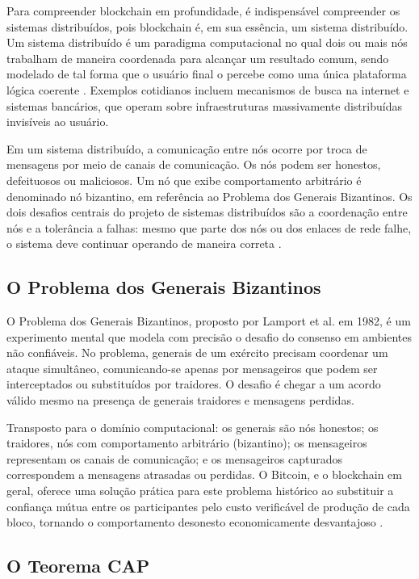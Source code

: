 \documentclass[12pt,a4paper]{report}
\begin{document}
Para compreender blockchain em profundidade, é indispensável compreender os sistemas distribuídos, pois blockchain é, em sua essência, um sistema distribuído. Um sistema distribuído é um paradigma computacional no qual dois ou mais nós trabalham de maneira coordenada para alcançar um resultado comum, sendo modelado de tal forma que o usuário final o percebe como uma única plataforma lógica coerente \cite{Bashir2023}. Exemplos cotidianos incluem mecanismos de busca na internet e sistemas bancários, que operam sobre infraestruturas massivamente distribuídas invisíveis ao usuário.

Em um sistema distribuído, a comunicação entre nós ocorre por troca de mensagens por meio de canais de comunicação. Os nós podem ser honestos, defeituosos ou maliciosos. Um nó que exibe comportamento arbitrário é denominado nó bizantino, em referência ao Problema dos Generais Bizantinos. Os dois desafios centrais do projeto de sistemas distribuídos são a coordenação entre nós e a tolerância a falhas: mesmo que parte dos nós ou dos enlaces de rede falhe, o sistema deve continuar operando de maneira correta \cite{Bashir2023}.

\subsection{O Problema dos Generais Bizantinos}

O Problema dos Generais Bizantinos, proposto por Lamport et al. em 1982, é um experimento mental que modela com precisão o desafio do consenso em ambientes não confiáveis. No problema, generais de um exército precisam coordenar um ataque simultâneo, comunicando-se apenas por mensageiros que podem ser interceptados ou substituídos por traidores. O desafio é chegar a um acordo válido mesmo na presença de generais traidores e mensagens perdidas.

Transposto para o domínio computacional: os generais são nós honestos; os traidores, nós com comportamento arbitrário (bizantino); os mensageiros representam os canais de comunicação; e os mensageiros capturados correspondem a mensagens atrasadas ou perdidas. O Bitcoin, e o blockchain em geral, oferece uma solução prática para este problema histórico ao substituir a confiança mútua entre os participantes pelo custo verificável de produção de cada bloco, tornando o comportamento desonesto economicamente desvantajoso \cite{Bashir2023}.

\subsection{O Teorema CAP}
\end{document}

